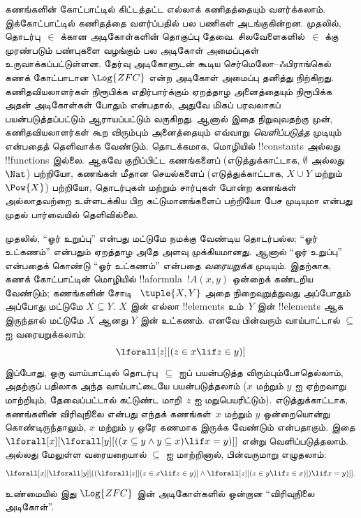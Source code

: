 \documentclass[../../../include/open-logic-section]{subfiles}
\begin{document}



கணங்களின் கோட்பாட்டில் கிட்டத்தட்ட எல்லாக் கணிதத்தையும் வளர்க்கலாம்.
இக்கோட்பாட்டில் கணிதத்தை வளர்ப்பதில் பல பணிகள் அடங்குகின்றன. முதலில்,
தொடர்பு~$\in$ க்கான அடிகோள்களின் தொகுப்பு தேவை. சிலவேளைகளில்~$\in$
க்கு முரண்படும் பண்புகளை வழங்கும் பல அடிகோள் அமைப்புகள் உருவாக்கப்பட்டுள்ளன.
தேர்வு அடிகோளுடன் கூடிய செர்மெலோ--ஃபிராங்கெல் கணக் கோட்பாடான
$\Log{ZFC}$ என்ற அடிகோள் அமைப்பு தனித்து நிற்கிறது. கணிதவியலாளர்கள்
நிரூபிக்க எதிர்பார்க்கும் ஏறத்தாழ அனைத்தையும் நிரூபிக்க அதன் அடிகோள்கள்
போதும் என்பதால், அதுவே மிகப் பரவலாகப் பயன்படுத்தப்பட்டும்
ஆராயப்பட்டும் வருகிறது. ஆனால் இதை நிறுவுவதற்கு முன், கணிதவியலாளர்கள்
கூற விரும்பும் அனைத்தையும் எவ்வாறு \emph{வெளிப்படுத்த} முடியும் என்பதைத்
தெளிவாக்க வேண்டும். தொடக்கமாக, மொழியில் !!{constant}s அல்லது
!!{function}s இல்லை. ஆகவே குறிப்பிட்ட கணங்களைப் (எடுத்துக்காட்டாக,
$\emptyset$ அல்லது $\Nat$) பற்றியோ, கணங்கள் மீதான செயல்களைப்
(எடுத்துக்காட்டாக, $X \cup Y$ மற்றும் $\Pow{X}$) பற்றியோ, தொடர்புகள்
மற்றும் சார்புகள் போன்ற கணங்கள் அல்லாதவற்றை உள்ளடக்கிய பிற
கட்டுமானங்களைப் பற்றியோ பேச முடியுமா என்பது முதல் பார்வையில் தெளிவில்லை.

முதலில், ``ஓர் உறுப்பு'' என்பது மட்டுமே நமக்கு வேண்டிய தொடர்பல்ல;
``ஓர் உட்கணம்'' என்பதும் ஏறத்தாழ அதே அளவு முக்கியமானது. ஆனால்
``ஓர் உறுப்பு'' என்பதைக் கொண்டு ``ஓர் உட்கணம்'' என்பதை
\emph{வரையறுக்க} முடியும். இதற்காக, கணக் கோட்பாட்டின் மொழியில்
!!a{formula}~$!A(x, y)$ ஒன்றைக் கண்டறிய வேண்டும்; கணங்களின் சோடி
~$\tuple{X, Y}$ அதை நிறைவுறுத்துவது அப்போதும் அப்போது மட்டுமே $X \subseteq Y$. $X$ இன்
எல்லா !!{element}s உம்~$Y$ இன் !!{element}s ஆக இருந்தால் மட்டுமே
$X$ ஆனது $Y$ இன் உட்கணம். எனவே பின்வரும் வாய்பாட்டால் $\subseteq$ ஐ
வரையறுக்கலாம்:
\[
\lforall[z][(z \in x \lif z \in y)]
\]
இப்போது, ஒரு வாய்பாட்டில் தொடர்பு~$\subseteq$ ஐப் பயன்படுத்த
விரும்பும்போதெல்லாம், அதற்குப் பதிலாக அந்த வாய்பாட்டையே பயன்படுத்தலாம்
($x$ மற்றும் $y$ ஐ ஏற்றவாறு மாற்றியும், தேவைப்பட்டால் கட்டுண்ட
மாறி~$z$ ஐ மறுபெயரிட்டும்). எடுத்துக்காட்டாக, கணங்களின் விரிவுநிலை
என்பது எந்தக் கணங்கள்~$x$ மற்றும் $y$ ஒன்றையொன்று கொண்டிருந்தாலும்,
$x$ மற்றும் $y$ ஒரே கணமாக இருக்க வேண்டும் என்பதாகும். இதை
$\lforall[x][\lforall[y][((x \subseteq y \land y
    \subseteq x) \lif x = y)]]$ என்று வெளிப்படுத்தலாம். அல்லது மேலுள்ள
வரையறையால் $\subseteq$ ஐ மாற்றினால், பின்வருமாறு எழுதலாம்:
\[
\lforall[x][\lforall[y][((\lforall[z][(z \in x \lif z \in y)] \land
    \lforall[z][(z \in y \lif z \in x)]) \lif x = y)]].
\]
உண்மையில் இது $\Log{ZFC}$ இன் அடிகோள்களில் ஒன்றான
``விரிவுநிலை அடிகோள்''.
\end{document}
